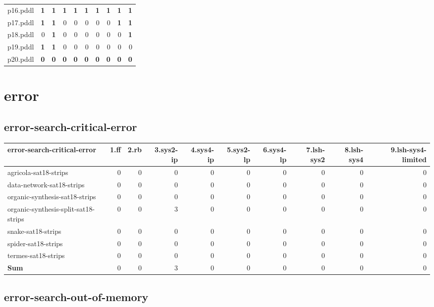 \documentclass{article}
\begin{document}
\begin{tabular}{@{}lrrrrrrrrr@{}}
p16.pddl & \textbf{1} & \textbf{1} & \textbf{1} & \textbf{1} & \textbf{1} & \textbf{1} & \textbf{1} & \textbf{1} & \textbf{1} \\
p17.pddl & \textbf{1} & \textbf{1} & 0 & 0 & 0 & 0 & 0 & \textbf{1} & \textbf{1} \\
p18.pddl & 0 & \textbf{1} & 0 & 0 & 0 & 0 & 0 & 0 & \textbf{1} \\
p19.pddl & \textbf{1} & \textbf{1} & 0 & 0 & 0 & 0 & 0 & 0 & 0 \\
p20.pddl & \textbf{0} & \textbf{0} & \textbf{0} & \textbf{0} & \textbf{0} & \textbf{0} & \textbf{0} & \textbf{0} & \textbf{0} \\
\end{tabular}

\hypertarget{error}{}
\section*{error}

\hypertarget{error-error-search-critical-error}{}
\subsection*{error-search-critical-error}

\begin{tabular}{@{}lrrrrrrrrr@{}}
error-search-critical-error & 1.ff & 2.rb & 3.sys2-ip & 4.sys4-ip & 5.sys2-lp & 6.sys4-lp & 7.lsh-sys2 & 8.lsh-sys4 & 9.lsh-sys4-limited \\
\midrule
agricola-sat18-strips & 0 & 0 & 0 & 0 & 0 & 0 & 0 & 0 & 0 \\
data-network-sat18-strips & 0 & 0 & 0 & 0 & 0 & 0 & 0 & 0 & 0 \\
organic-synthesis-sat18-strips & 0 & 0 & 0 & 0 & 0 & 0 & 0 & 0 & 0 \\
organic-synthesis-split-sat18-strips & 0 & 0 & 3 & 0 & 0 & 0 & 0 & 0 & 0 \\
snake-sat18-strips & 0 & 0 & 0 & 0 & 0 & 0 & 0 & 0 & 0 \\
spider-sat18-strips & 0 & 0 & 0 & 0 & 0 & 0 & 0 & 0 & 0 \\
termes-sat18-strips & 0 & 0 & 0 & 0 & 0 & 0 & 0 & 0 & 0 \\
\textbf{Sum} & 0 & 0 & 3 & 0 & 0 & 0 & 0 & 0 & 0 \\
\end{tabular}

\hypertarget{error-error-search-out-of-memory}{}
\subsection*{error-search-out-of-memory}
\end{document}
